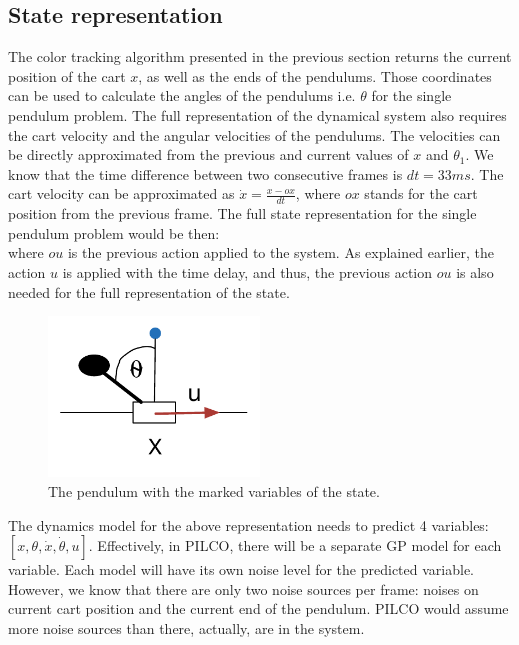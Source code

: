 \subsection{State representation}
\label{s:exps:state}
The color tracking algorithm presented in the previous section returns the current position of the cart $x$, as well as the ends of the pendulums. Those coordinates can be used to calculate the angles of the pendulums i.e. $\theta$ for the single pendulum problem. The full representation of the dynamical system also requires the cart velocity and the angular velocities of the pendulums. The velocities can be directly approximated from the previous and current values of $x$ and $\theta_{1}$. We know that the time difference between two consecutive frames is $dt=33ms$. The cart velocity can be approximated as $\dot{x}=\frac{x-ox}{dt}$, where $ox$ stands for the cart position from the previous frame. The full state representation for the single pendulum problem would be then:
\begin{equation}
[ou, x, \theta, \dot{x}, \dot{\theta}, u] \nonumber
\end{equation}
where $ou$ is the previous action applied to the system. As explained earlier, the action $u$ is applied with the time delay, and thus, the previous action $ou$ is also needed for the full representation of the state. 

\begin{figure}[H]
\centering
\includegraphics[width=0.5\textwidth, scale=0.5]{plots/pendulum_maths}
\caption{\label{fig:exps:statepend} The pendulum with the marked variables of the state.}
\end{figure}

\noindent The dynamics model for the above representation needs to predict 4 variables: $[x, \theta, \dot{x}, \dot{\theta}, u]$. Effectively, in PILCO, there will be a separate GP model for each variable. Each model will have its own noise level for the predicted variable. However, we know that there are only two noise sources per frame: noises on current cart position and the current end of the pendulum. PILCO would assume more noise sources than there, actually, are in the system.

